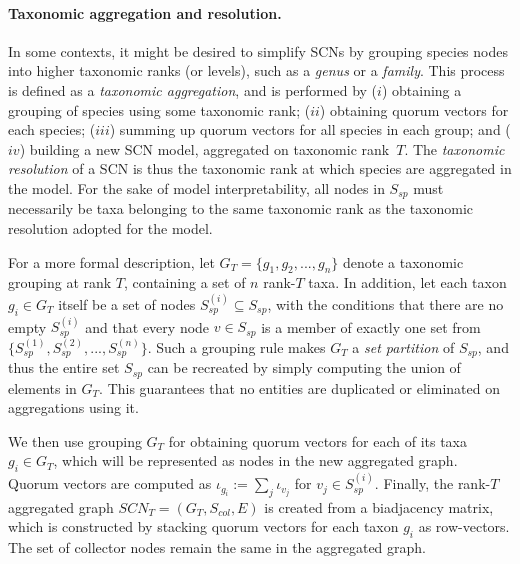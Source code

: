 {\paragraph{Taxonomic aggregation and resolution.}\label{section:taxonomic_aggregation}
In some contexts, it might be desired to simplify SCNs by grouping species nodes into higher taxonomic ranks (or levels), such as a \textit{genus} or a \textit{family}. This process is defined as a \textit{taxonomic aggregation}, and is performed by 
($i$) obtaining a grouping of species using some taxonomic rank; 
($ii$) obtaining quorum vectors for each species; 
($iii$) summing up quorum vectors for all species in each group; and
($iv$) building a new SCN model, aggregated on taxonomic rank~$T$. 
The \textit{taxonomic resolution} of a SCN is thus the taxonomic rank at which species are aggregated in the model. For the sake of model interpretability, all nodes in $S_{sp}$ must necessarily be taxa belonging to the same taxonomic rank as the taxonomic resolution adopted for the model.

For a more formal description, let $G_T = \{g_1,g_2,..., g_n\}$ denote a taxonomic grouping at rank $T$, containing a set of $n$ rank-$T$ taxa.  In addition, let each taxon $g_i \in G_T$ itself be a set of nodes $S_{sp}^{(i)} \subseteq S_{sp}$, with the conditions that there are no empty $S_{sp}^{(i)}$ and that every node $v \in S_{sp}$ is a member of exactly one set  from $ \{ S_{sp}^{(1)}, S_{sp}^{(2)}, ..., S_{sp}^{(n)} \}$.
Such a grouping rule makes $G_T$ a \emph{set partition} of $S_{sp}$, and thus the entire set $S_{sp}$ can be recreated by simply computing the union of elements in $G_T$. This guarantees that no entities are duplicated or eliminated on aggregations using it.

We then use grouping $G_T$ for obtaining quorum vectors for each of its taxa $g_i \in G_T$, which will be represented as nodes in the new aggregated graph. Quorum vectors are computed as $ \iota_{g_i} := \sum_j \iota_{v_j}  $ for $v_j \in S_{sp}^{(i)}$. Finally, the rank-$T$ aggregated  graph $SCN_T=(G_T,S_{col},E)$ is created from a biadjacency matrix, which is constructed by stacking quorum vectors for each taxon $g_i$ as row-vectors. The set of collector nodes remain the same in the aggregated graph.


}
